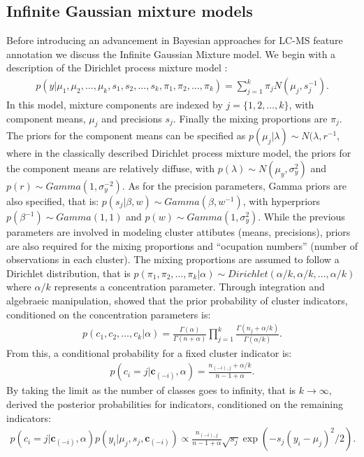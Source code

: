 \begin{DoubleSpace*}
\section{Infinite Gaussian mixture models}
Before introducing an advancement in Bayesian approaches for LC-MS feature annotation we discuss the Infinite Gaussian Mixture model. We begin with a description of the Dirichlet process mixture model \cite{ferguson1973}: 
\begin{align}
p(y|\mu_1,\mu_2, \hdots, \mu_k, s_1, s_2, \hdots, s_k, \pi_1, \pi_2, \hdots, \pi_k) = \sum_{j=1}^{k} \pi_j N(\mu_j,s_j^{-1}).
\end{align}
In this model, mixture components are indexed by $j=\{1,2, \hdots,k\}$, with component means, $\mu_j$ and precisions $s_j$. Finally the mixing proportions are $\pi_j$. The priors for the component means can be specified as $p(\mu_j|\lambda) \sim N(\lambda, r^{-1}$, where in the classically described Dirichlet process mixture model, the priors for the component means are relatively diffuse, with $p(\lambda)\sim N(\mu_y,\sigma_y^2)$ and $p(r)\sim Gamma(1,\sigma_y^{-2})$.  As for the precision parameters, Gamma priors are also specified, that is: $p(s_j|\beta,w) \sim Gamma(\beta,w^{-1})$, with hyperpriors $p(\beta^{-1}) \sim Gamma(1,1)$ and $p(w)\sim Gamma(1,\sigma_y^2)$. While the previous parameters are involved in modeling cluster attibutes (means, precisions), priors are also required for the mixing proportions and ``ocupation numbers'' (number of observations in each cluster). The mixing proportions are assumed to follow a Dirichlet distribution, that is $p(\pi_1,\pi_2,\hdots, \pi_k|\alpha)\sim Dirichlet(\alpha/k,\alpha/k,\hdots, \alpha/k)$ where $\alpha/k$ represents a concentration parameter. Through integration and algebraeic manipulation, \cite{rasmussen1999} showed that the prior probability of cluster indicators, conditioned on the concentration parameters is:
\begin{align}
p(c_1,c_2, \hdots, c_k|\alpha)=\frac{\Gamma(\alpha)}{\Gamma(n+\alpha)} \prod_{j=1}^{k} \frac{\Gamma(n_j+\alpha/k)}{\Gamma(\alpha/k)}.
\end{align} 
From this, a conditional probability for a fixed cluster indicator is: 
\begin{align}
p(c_i=j|\textbf{c}_{(-i)},\alpha) = \frac{n_{(-i),j}+\alpha/k}{n-1+\alpha}.
\end{align}
By taking the limit as the number of classes goes to infinity, that is $k\rightarrow \infty$, \cite{rasmussen1999} derived the posterior probabilities for indicators, conditioned on the remaining indicators:
\begin{align}
p(c_i=j|\textbf{c}_{(-i)},\alpha) p(y_i|\mu_j,s_j,\textbf{c}_{(-i)})\propto \frac{n_{(-i),j}}{n-1+\alpha} \sqrt{s_j} \exp(-s_j(y_i-\mu_j)^2/2).
\end{align}


\end{DoubleSpace*}
